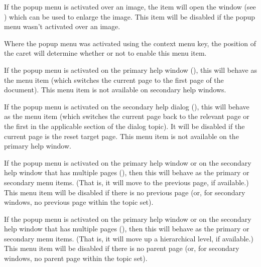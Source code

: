 
If the popup menu is activated over an image, the 
item will open the  window (see
) which can be used to enlarge the
image. This item will be disabled if the popup menu wasn't activated
over an image.

Where the popup menu was activated using the context menu
 key, 
the position of the caret will determine
whether or not to enable this menu item.


If the popup menu is activated on the primary help window
(), this will
behave as the  menu item (which
switches the current page to the first page of the document).
This menu item is not available on secondary help windows.


If the popup menu is activated on the secondary help dialog
(), this
will behave as the  menu item
(which switches the current page back to the relevant page or the
first in the applicable section of the dialog topic).
It will be disabled if the current page is the reset target page.
This menu item is not available on the primary help window.


If the popup menu is activated on the primary help window or on the
secondary help window that has multiple pages
(), then this
will behave as the primary  or
secondary  menu items.  (That
is, it will move to the previous page, if available.) This menu item
will be disabled if there is no previous page (or, for secondary
windows, no previous page within the topic set).


If the popup menu is activated on the primary help window or on the
secondary help window that has multiple pages
(), then this will behave
as the primary  or
secondary  menu items. (That is, it
will move up a hierarchical level, if available.)
This menu item will be disabled if there is no parent page (or, for
secondary windows, no parent page within the topic set).

